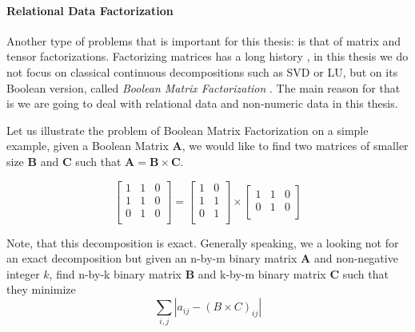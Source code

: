\paragraph{Relational Data Factorization}\label{sec:intro_redf}
Another type of problems that is important for this thesis: is that of
matrix and tensor factorizations. Factorizing matrices has a long
history \parencite{matrix_book}, in this thesis we do not focus on
classical continuous decompositions such as SVD or LU, but on its
Boolean version, called \textit{Boolean Matrix
Factorization} \parencite{phd_miettinen}. The main reason for that is
we are going to deal with relational data and non-numeric data in this
thesis.


Let us illustrate the problem of Boolean Matrix Factorization on a
simple example, given a Boolean Matrix $\mathbf{A}$, we would like to find two
matrices of smaller size $\mathbf{B}$ and $\mathbf{C}$ such that
$\mathbf{A} = \mathbf{B} \times \mathbf{C}$.


\def\Amtrx{\begin{bmatrix}
    1   & 1 & 0 \\
    1   & 1 & 0 \\
    0   & 1 & 0 \\
\end{bmatrix}}

\def\Bmtrx{\begin{bmatrix}
1   &0  \\
1   &1  \\
0   &1  \\
\end{bmatrix}}

\def\Cmtrx{\begin{bmatrix}
1   &1  & 0 \\
0   &1  & 0 \\
\end{bmatrix}}

\begin{equation*}
    \Amtrx =  \Bmtrx \times \Cmtrx
\end{equation*}

Note, that this decomposition is exact. Generally speaking, we a
looking not for an exact decomposition but given an n-by-m binary
matrix $\mathbf{A}$ and non-negative integer $k$, find n-by-k binary
matrix $\mathbf{B}$ and k-by-m binary matrix $\mathbf{C}$ such that they minimize
\begin{equation*}
    \sum_{i,j} | a_{ij} - (B\times C)_{ij}|
\end{equation*}


